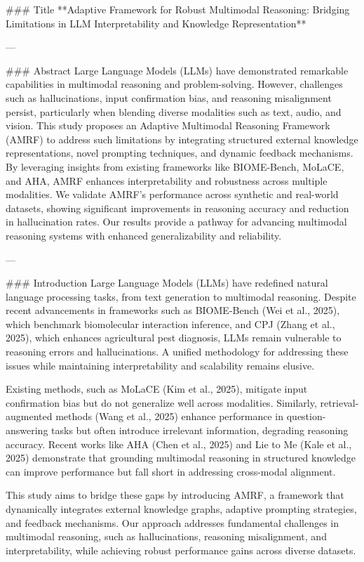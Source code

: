 ### Title  
**Adaptive Framework for Robust Multimodal Reasoning: Bridging Limitations in LLM Interpretability and Knowledge Representation**

---

### Abstract  
Large Language Models (LLMs) have demonstrated remarkable capabilities in multimodal reasoning and problem-solving. However, challenges such as hallucinations, input confirmation bias, and reasoning misalignment persist, particularly when blending diverse modalities such as text, audio, and vision. This study proposes an Adaptive Multimodal Reasoning Framework (AMRF) to address such limitations by integrating structured external knowledge representations, novel prompting techniques, and dynamic feedback mechanisms. By leveraging insights from existing frameworks like BIOME-Bench, MoLaCE, and AHA, AMRF enhances interpretability and robustness across multiple modalities. We validate AMRF's performance across synthetic and real-world datasets, showing significant improvements in reasoning accuracy and reduction in hallucination rates. Our results provide a pathway for advancing multimodal reasoning systems with enhanced generalizability and reliability.

---

### Introduction  
Large Language Models (LLMs) have redefined natural language processing tasks, from text generation to multimodal reasoning. Despite recent advancements in frameworks such as BIOME-Bench (Wei et al., 2025), which benchmark biomolecular interaction inference, and CPJ (Zhang et al., 2025), which enhances agricultural pest diagnosis, LLMs remain vulnerable to reasoning errors and hallucinations. A unified methodology for addressing these issues while maintaining interpretability and scalability remains elusive.  

Existing methods, such as MoLaCE (Kim et al., 2025), mitigate input confirmation bias but do not generalize well across modalities. Similarly, retrieval-augmented methods (Wang et al., 2025) enhance performance in question-answering tasks but often introduce irrelevant information, degrading reasoning accuracy. Recent works like AHA (Chen et al., 2025) and Lie to Me (Kale et al., 2025) demonstrate that grounding multimodal reasoning in structured knowledge can improve performance but fall short in addressing cross-modal alignment.  

This study aims to bridge these gaps by introducing AMRF, a framework that dynamically integrates external knowledge graphs, adaptive prompting strategies, and feedback mechanisms. Our approach addresses fundamental challenges in multimodal reasoning, such as hallucinations, reasoning misalignment, and interpretability, while achieving robust performance gains across diverse datasets.

